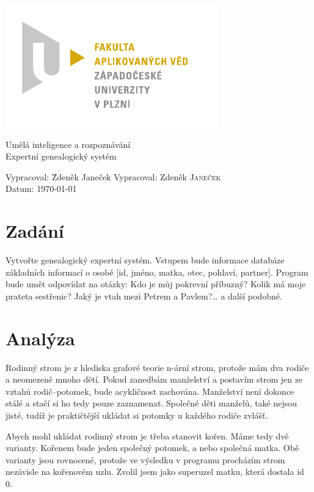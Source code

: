\documentclass[a4paper, 12pt]{article}
\begin{document}
\begin{titlepage}
\includegraphics[bb=0 0 167 96]{fav_cmyk.pdf}
\vfill
\begin{center}
{\huge Umělá inteligence a rozpoznávání}\\[3ex]
{\Large Expertní genealogický systém}
\end{center}
\vfill
\begin{tabbing}
Vypracoval: \hspace{1ex}\=Zdeněk Janeček\kill
Vypracoval: \>Zdeněk \textsc{Janeček}\\[1ex]
Datum:\> \today
\end{tabbing}
\end{titlepage}

\section{Zadání}
Vytvořte genealogický expertní systém. Vstupem bude informace databáze
základních informací o osobě [id, jméno, matka, otec, pohlaví, partner].
Program bude umět odpovídat na otázky: Kdo je můj pokrevní příbuzný?
Kolik má moje prateta sestřenic? Jaký je vtah mezi Petrem a Pavlem?\ldots
a další podobné.

\section{Analýza}
Rodinný strom je z hlediska grafové teorie n-ární strom, protože mám dva
rodiče a neomezeně mnoho dětí. Pokud zanedbám manželství a postavím
strom jen ze vztahů rodič--potomek, bude acykličnost zachována.
Manželství není dokonce stálé a stačí si ho tedy pouze zaznamenat.
Společné děti manželů, také nejsou jisté, tudíž je praktičtější ukládat
si potomky u každého rodiče zvlášť.

Abych mohl ukládat rodinný strom je třeba stanovit kořen. Máme tedy
dvě varianty. Kořenem bude jeden společný potomek, a nebo společná
matka. Obě varianty jsou rovnocené, protože ve výsledku v programu
procházím strom nezávisle na kořenovém uzlu. Zvolil jsem jako superuzel
matku, která dostala id 0.
\end{document}
